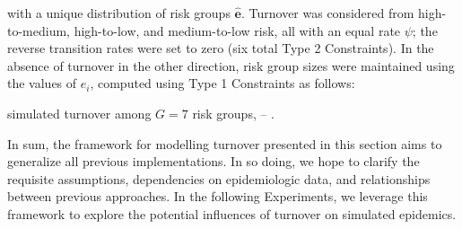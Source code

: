 with a unique distribution of risk groups $\bm{\hat{e}}$.
Turnover was considered from
high-to-medium, high-to-low, and medium-to-low risk,
all with an equal rate $\psi$;
the reverse transition rates were set to zero
(six total Type 2 Constraints).
In the absence of turnover in the other direction,
risk group sizes were maintained using the values of $\hat{e}_i$,
computed using Type 1 Constraints as follows:

\par
\citet{Boily2015} simulated turnover among $G = 7$ risk groups, -- .
\par
In sum, the framework for modelling turnover presented in this section
aims to generalize all previous implementations.
In so doing, we hope to clarify the requisite assumptions,
dependencies on epidemiologic data,
and relationships between previous approaches.
In the following Experiments, we leverage this framework to explore
the potential influences of turnover on simulated epidemics.
